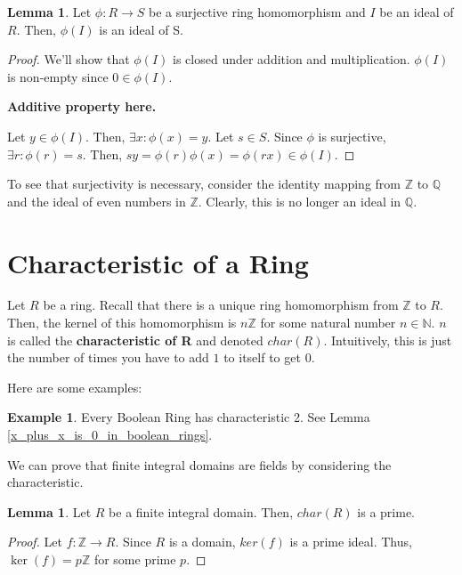 \documentclass{article}
\theoremstyle{definition}
\newtheorem{lemma}[theorem]{Lemma}
\newtheorem{example}[theorem]{Example}
\newcommand{\N}{\mathbb{N}}
\newcommand{\Z}{\mathbb{Z}}
\newcommand{\Q}{\mathbb{Q}}
\begin{document}
\begin{lemma}
    Let $\phi: R \xrightarrow{} S$ be a surjective ring homomorphism and $I$
    be an ideal of $R$. Then, $\phi(I)$ is an ideal of S.
\end{lemma}
\begin{proof}
    We'll show that $\phi(I)$ is closed under addition and multiplication.
    $\phi(I)$ is non-empty since $0 \in \phi(I)$.

    \textbf{Additive property here.}

    Let $y \in \phi(I)$. Then, $\exists x: \phi(x) = y$. Let $s \in S$.
    Since $\phi$ is surjective, $\exists r: \phi(r) = s$.
    Then, $sy = \phi(r) \phi(x) = \phi(rx) \in \phi(I)$.
\end{proof}

To see that surjectivity is necessary, consider the identity mapping from $\Z$
to $\Q$ and the ideal of even numbers in $\Z$. Clearly, this is no longer an ideal
in $\Q$.

\newpage

\section{Characteristic of a Ring}\label{characteristic_of_rings}

Let $R$ be a ring. Recall that there is a unique ring homomorphism from $\Z$ to $R$.
Then, the kernel of this homomorphism is $n\Z$ for some natural number $n \in \N$.
$n$ is called the \textbf{characteristic of R} and denoted $char(R)$. Intuitively,
this is just the number of times you have to add $1$ to itself to get $0$.

Here are some examples:

\begin{example}
    Every Boolean Ring has characteristic 2. See Lemma \ref{x_plus_x_is_0_in_boolean_rings}.
\end{example}

We can prove that finite integral domains are fields by considering
the characteristic.

\begin{lemma}
    Let $R$ be a finite integral domain. Then, $char(R)$ is a prime.
\end{lemma}
\begin{proof}
    Let $f:\Z \xrightarrow{} R$. Since $R$ is a domain, $ker(f)$
    is a prime ideal. Thus, $\ker(f) = p\Z$ for some prime $p$.
\end{proof}
\end{document}
